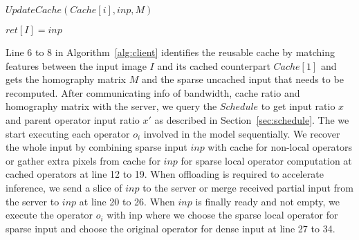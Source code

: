 \begin{algorithm}[htbp]
{{{                    $UpdateCache(Cache[i], inp, M)$
                }

            }
            $ret[I] = inp$
       }
      
\end{algorithm}


Line 6 to 8 in Algorithm~\ref{alg:client} identifies the reusable cache by matching features between the input image $I$ and its cached counterpart $Cache[1]$ and gets the homography matrix $M$ and the sparse uncached input that needs to be recomputed.
After communicating info of bandwidth, cache ratio and homography matrix with the server, we query the $Schedule$ to get input ratio $x$ and parent operator input ratio $x'$ as described in Section~\ref{sec:schedule}.
The we start executing each operator $o_i$ involved in the model sequentially.
We recover the whole input by combining sparse input $inp$ with cache for non-local operators or gather extra pixels from cache for $inp$ for sparse local operator computation at cached operators at line 12 to 19.
When offloading is required to accelerate inference, we send a slice of $inp$ to the server or merge received partial input from the server to $inp$ at line 20 to 26.
When $inp$ is finally ready and not empty, we execute the operator $o_i$ with inp where we choose the sparse local operator for sparse input and choose the original operator for dense input at line 27 to 34.


